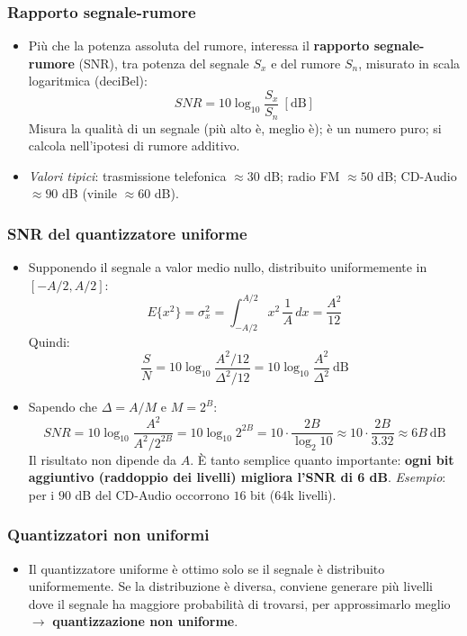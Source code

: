 \documentclass[12pt, a4paper]{article}
\begin{document}
\subsubsection{Rapporto segnale-rumore}
\begin{itemize}
    \item Più che la potenza assoluta del rumore, interessa il \textbf{rapporto segnale-rumore} (SNR), tra potenza del segnale $S_x$ e del rumore $S_n$, misurato in scala logaritmica (deciBel):
    $$SNR = 10\log_{10}\frac{S_x}{S_n}\ [\text{dB}]$$
    Misura la qualità di un segnale (più alto è, meglio è); è un numero puro; si calcola nell'ipotesi di rumore additivo.
    \item \textit{Valori tipici}: trasmissione telefonica $\approx30$ dB; radio FM $\approx50$ dB; CD-Audio $\approx90$ dB (vinile $\approx60$ dB).
\end{itemize}

\subsubsection{SNR del quantizzatore uniforme}
\begin{itemize}
    \item Supponendo il segnale a valor medio nullo, distribuito uniformemente in $[-A/2,A/2]$:
    $$E\{x^2\}=\sigma_x^2 = \int_{-A/2}^{A/2} x^2\,\frac1A\,dx = \frac{A^2}{12}$$
    Quindi:
    $$\frac{S}{N} = 10\log_{10}\frac{A^2/12}{\Delta^2/12} = 10\log_{10}\frac{A^2}{\Delta^2}\ \text{dB}$$
    \item Sapendo che $\Delta=A/M$ e $M=2^B$:
    $$SNR = 10\log_{10}\frac{A^2}{A^2/2^{2B}} = 10\log_{10}2^{2B} = 10\cdot\frac{2B}{\log_2 10}\approx 10\cdot\frac{2B}{3.32}\approx 6B\ \text{dB}$$
    Il risultato non dipende da $A$. È tanto semplice quanto importante: \textbf{ogni bit aggiuntivo (raddoppio dei livelli) migliora l'SNR di 6 dB}. \textit{Esempio}: per i $90$ dB del CD-Audio occorrono $16$ bit ($64$k livelli).
\end{itemize}

\subsubsection{Quantizzatori non uniformi}
\begin{itemize}
    \item Il quantizzatore uniforme è ottimo solo se il segnale è distribuito uniformemente. Se la distribuzione è diversa, conviene generare più livelli dove il segnale ha maggiore probabilità di trovarsi, per approssimarlo meglio $\to$ \textbf{quantizzazione non uniforme}.
\end{itemize}
\end{document}
